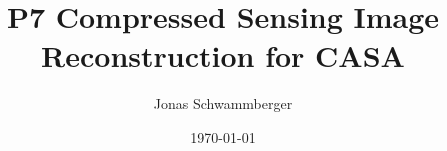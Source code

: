 \documentclass[11pt]{article}
\numberwithin{equation}{section}
\begin{document}
\title{P7 Compressed Sensing Image Reconstruction for CASA}
\author{Jonas Schwammberger}
\date{\today}
\maketitle

\newpage
\pagestyle{abstract}


\newpage
\pagestyle{tableofcontent}
\tableofcontents  	
\newpage

\pagestyle{documentstyle}
\setcounter{page}{1}


\newpage

\newpage

\newpage

\newpage
%
%


\newpage
{}
%

\newpage
\listoffigures
\listoftables

\newpage

\newpage

\end{document}
